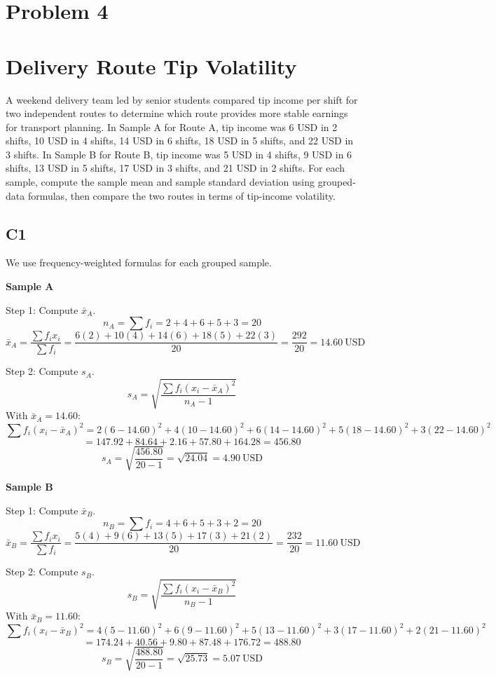 \begin{ExamProblems}
		\newpage
		\item
		\section{Problem 4}
		\section{Delivery Route Tip Volatility}
		A weekend delivery team led by senior students compared tip income per shift for two independent routes to determine which route provides more stable earnings for transport planning. In Sample A for Route A, tip income was 6 USD in 2 shifts, 10 USD in 4 shifts, 14 USD in 6 shifts, 18 USD in 5 shifts, and 22 USD in 3 shifts. In Sample B for Route B, tip income was 5 USD in 4 shifts, 9 USD in 6 shifts, 13 USD in 5 shifts, 17 USD in 3 shifts, and 21 USD in 2 shifts. For each sample, compute the sample mean and sample standard deviation using grouped-data formulas, then compare the two routes in terms of tip-income volatility.

		\subsection*{C1}
		We use frequency-weighted formulas for each grouped sample.

		\textbf{Sample A}

		Step 1: Compute $\bar{x}_A$.
		\[
		n_A = \sum f_i = 2+4+6+5+3 = 20
		\]
		\[
		\bar{x}_A = \frac{\sum f_i x_i}{\sum f_i}
		= \frac{6(2)+10(4)+14(6)+18(5)+22(3)}{20}
		= \frac{292}{20}
		= 14.60\ \text{USD}
		\]

		Step 2: Compute $s_A$.
		\[
		s_A = \sqrt{\frac{\sum f_i(x_i-\bar{x}_A)^2}{n_A-1}}
		\]
		With $\bar{x}_A=14.60$:
		\[
		\sum f_i(x_i-\bar{x}_A)^2 = 2(6-14.60)^2 + 4(10-14.60)^2 + 6(14-14.60)^2 + 5(18-14.60)^2 + 3(22-14.60)^2
		\]
		\[
		\qquad = 147.92 + 84.64 + 2.16 + 57.80 + 164.28 = 456.80
		\]
		\[
		s_A = \sqrt{\frac{456.80}{20-1}} = \sqrt{24.04} = 4.90\ \text{USD}
		\]

		\textbf{Sample B}

		Step 1: Compute $\bar{x}_B$.
		\[
		n_B = \sum f_i = 4+6+5+3+2 = 20
		\]
		\[
		\bar{x}_B = \frac{\sum f_i x_i}{\sum f_i}
		= \frac{5(4)+9(6)+13(5)+17(3)+21(2)}{20}
		= \frac{232}{20}
		= 11.60\ \text{USD}
		\]

		Step 2: Compute $s_B$.
		\[
		s_B = \sqrt{\frac{\sum f_i(x_i-\bar{x}_B)^2}{n_B-1}}
		\]
		With $\bar{x}_B=11.60$:
		\[
		\sum f_i(x_i-\bar{x}_B)^2 = 4(5-11.60)^2 + 6(9-11.60)^2 + 5(13-11.60)^2 + 3(17-11.60)^2 + 2(21-11.60)^2
		\]
		\[
		\qquad = 174.24 + 40.56 + 9.80 + 87.48 + 176.72 = 488.80
		\]
		\[
		s_B = \sqrt{\frac{488.80}{20-1}} = \sqrt{25.73} = 5.07\ \text{USD}
		\]


\end{ExamProblems}
